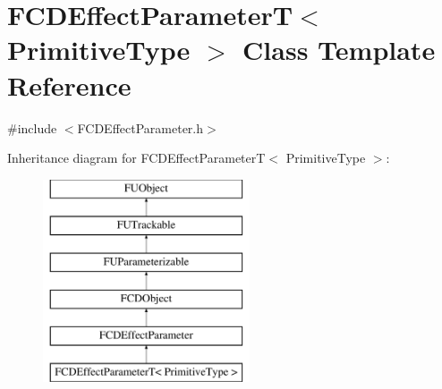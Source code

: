 \hypertarget{classFCDEffectParameterT}{
\section{FCDEffectParameterT$<$ PrimitiveType $>$ Class Template Reference}
\label{classFCDEffectParameterT}
}


{\ttfamily \#include $<$FCDEffectParameter.h$>$}

Inheritance diagram for FCDEffectParameterT$<$ PrimitiveType $>$:\begin{figure}[H]
\begin{center}
\leavevmode
\includegraphics[height=6.000000cm]{classFCDEffectParameterT}
\end{center}
\end{figure}
